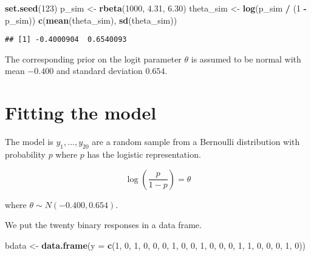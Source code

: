 \documentclass[
]{book}
\newenvironment{Shaded}{\begin{snugshade}}{\end{snugshade}}
\newcommand{\DataTypeTok}[1]{\textcolor[rgb]{0.13,0.29,0.53}{#1}}
\newcommand{\DecValTok}[1]{\textcolor[rgb]{0.00,0.00,0.81}{#1}}
\newcommand{\FloatTok}[1]{\textcolor[rgb]{0.00,0.00,0.81}{#1}}
\newcommand{\KeywordTok}[1]{\textcolor[rgb]{0.13,0.29,0.53}{\textbf{#1}}}
\newcommand{\NormalTok}[1]{#1}
\newcommand{\OperatorTok}[1]{\textcolor[rgb]{0.81,0.36,0.00}{\textbf{#1}}}
\newcommand{\StringTok}[1]{\textcolor[rgb]{0.31,0.60,0.02}{#1}}
\begin{document}
\begin{Shaded}
\begin{Highlighting}[]
\KeywordTok{set.seed}\NormalTok{(}\DecValTok{123}\NormalTok{)}
\NormalTok{p_sim <-}\StringTok{ }\KeywordTok{rbeta}\NormalTok{(}\DecValTok{1000}\NormalTok{, }\FloatTok{4.31}\NormalTok{, }\FloatTok{6.30}\NormalTok{)}
\NormalTok{theta_sim <-}\StringTok{ }\KeywordTok{log}\NormalTok{(p_sim }\OperatorTok{/}\StringTok{ }\NormalTok{(}\DecValTok{1} \OperatorTok{-}\StringTok{ }\NormalTok{p_sim))}
\KeywordTok{c}\NormalTok{(}\KeywordTok{mean}\NormalTok{(theta_sim), }\KeywordTok{sd}\NormalTok{(theta_sim))}
\end{Highlighting}
\end{Shaded}

\begin{verbatim}
## [1] -0.4000904  0.6540093
\end{verbatim}

The corresponding prior on the logit parameter \(\theta\) is assumed to be normal with mean \(-0.400\) and standard deviation \(0.654\).

\hypertarget{fitting-the-model}{%
\section{Fitting the model}\label{fitting-the-model}}

The model is \(y_1, ..., y_{20}\) are a random sample from a Bernoulli distribution with probability \(p\) where \(p\) has the logistic representation.

\[
\log \left(\frac{p}{1-p}\right) = \theta
\]

where \(\theta \sim N(-0.400, 0.654)\).

We put the twenty binary responses in a data frame.

\begin{Shaded}
\begin{Highlighting}[]
\NormalTok{bdata <-}\StringTok{ }\KeywordTok{data.frame}\NormalTok{(}\DataTypeTok{y =} \KeywordTok{c}\NormalTok{(}\DecValTok{1}\NormalTok{, }\DecValTok{0}\NormalTok{, }\DecValTok{1}\NormalTok{, }\DecValTok{0}\NormalTok{, }\DecValTok{0}\NormalTok{, }\DecValTok{0}\NormalTok{, }\DecValTok{1}\NormalTok{, }
\DecValTok{0}\NormalTok{, }\DecValTok{0}\NormalTok{, }\DecValTok{1}\NormalTok{, }\DecValTok{0}\NormalTok{, }\DecValTok{0}\NormalTok{, }\DecValTok{0}\NormalTok{, }\DecValTok{1}\NormalTok{, }\DecValTok{1}\NormalTok{, }\DecValTok{0}\NormalTok{, }\DecValTok{0}\NormalTok{, }\DecValTok{0}\NormalTok{, }\DecValTok{1}\NormalTok{, }\DecValTok{0}\NormalTok{))}
\end{Highlighting}
\end{Shaded}
\end{document}
